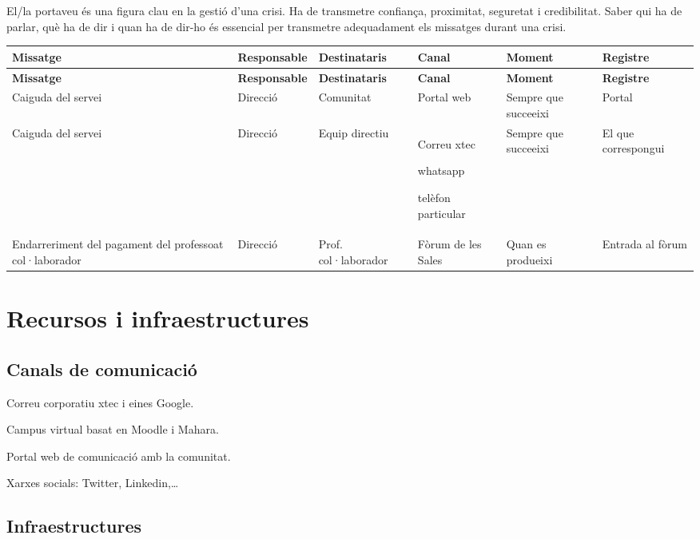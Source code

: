 \documentclass[fontsize=10pt,%
paper=a4,%
DIV=14,%
pagesize=auto,%
parskip=half,
captions=tableheading,%
numbers=noenddot,%
toc=graduated%
]{scrartcl}
\renewcommand{\arraystretch}{1.75}%
\renewcommand{\arraystretch}{1.75}%
\begin{document}
El/la portaveu és una figura clau en la gestió d'una crisi. Ha de transmetre
confiança, proximitat, seguretat i credibilitat. Saber qui ha de parlar, què ha
de dir i quan ha de dir-ho és essencial per transmetre adequadament els
missatges durant una crisi.



\small{
\setlength{\tabcolsep}{10pt}
\renewcommand{\arraystretch}{1.5}
\begin{longtable}{p{3cm}p{2cm}p{2cm}p{1.5cm}p{2cm}p{1.5cm}}
\hline
\textbf{Missatge}  & \textbf{Responsable} & \textbf{Destinataris} & \textbf{Canal} & \textbf{Moment}      & \textbf{Registre} \\
\hline \endfirsthead
\hline
\textbf{Missatge}  & \textbf{Responsable} & \textbf{Destinataris} & \textbf{Canal} & \textbf{Moment}      & \textbf{Registre} \\
\hline \endhead
Caiguda del servei & Direcció             & Comunitat             & Portal web     & Sempre que succeeixi & Portal            \\
Caiguda del servei & Direcció             & Equip directiu        & Correu xtec

whatsapp

telèfon particular
                   & Sempre que succeeixi & El que correspongui                                                               \\
Endarreriment del pagament del professoat col·laborador & Direcció & Prof. col·laborador & Fòrum de les Sales & Quan es produeixi & Entrada al fòrum\\
\end{longtable}
}%


\section{Recursos i infraestructures}\label{sec:recursos}

\subsection{Canals de comunicació}

Correu corporatiu xtec i eines Google.

Campus virtual basat en Moodle i Mahara.

Portal web de comunicació amb la comunitat.

Xarxes socials: Twitter, Linkedin,\dots

\subsection{Infraestructures}
\end{document}
